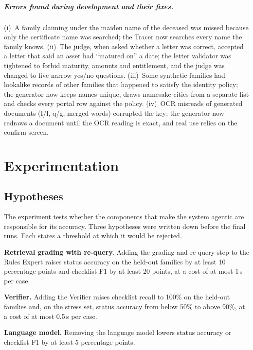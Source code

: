 \documentclass[12pt,a4paper,oneside]{report}
\begin{document}
\paragraph{Errors found during development and their fixes.} (i)~A family claiming under the maiden name of the deceased was missed because only the certificate name was searched; the Tracer now searches every name the family knows. (ii)~The judge, when asked whether a letter was correct, accepted a letter that said an asset had ``matured on'' a date; the letter validator was tightened to forbid maturity, amounts and entitlement, and the judge was changed to five narrow yes/no questions. (iii)~Some synthetic families had lookalike records of other families that happened to satisfy the identity policy; the generator now keeps names unique, draws namesake cities from a separate list and checks every portal row against the policy. (iv)~OCR misreads of generated documents (I/l, q/g, merged words) corrupted the key; the generator now redraws a document until the OCR reading is exact, and real use relies on the confirm screen.

\chapter{Experimentation}\label{ch:exp}
\section{Hypotheses}
The experiment tests whether the components that make the system agentic are responsible for its accuracy. Three hypotheses were written down before the final runs. Each states a threshold at which it would be rejected.

\begin{description}[leftmargin=1.4cm,labelwidth=1.1cm,itemsep=2pt]
\item[H1] \textbf{Retrieval grading with re-query.} Adding the grading and re-query step to the Rules Expert raises status accuracy on the held-out families by at least 10 percentage points and checklist F1 by at least 20 points, at a cost of at most 1\,s per case.
\item[H2] \textbf{Verifier.} Adding the Verifier raises checklist recall to 100\% on the held-out families and, on the stress set, status accuracy from below 50\% to above 90\%, at a cost of at most 0.5\,s per case.
\item[H3] \textbf{Language model.} Removing the language model lowers status accuracy or checklist F1 by at least 5 percentage points.
\end{description}
\end{document}
